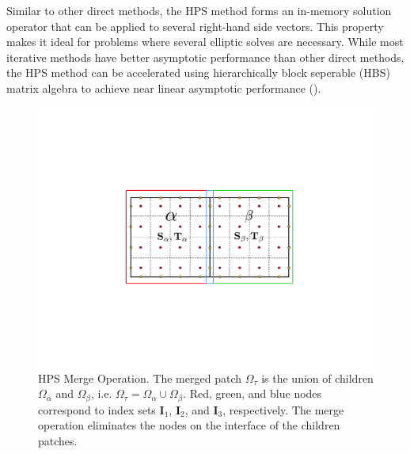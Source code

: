 Similar to other direct methods, the HPS method forms an in-memory solution operator that can be applied to several right-hand side vectors. This property makes it ideal for problems where several elliptic solves are necessary. While most iterative methods have better asymptotic performance than other direct methods, the HPS method can be accelerated using hierarchically block seperable (HBS) matrix algebra to achieve near linear asymptotic performance (\cite{gillman2014direct}).

\begin{figure}
    \centering
    \includegraphics[width=0.7\columnwidth]{figures/merge_figure.pdf}
    \caption{HPS Merge Operation. The merged patch $\Omega_{\tau}$ is the union of children $\Omega_{\alpha}$ and $\Omega_{\beta}$, i.e. $\Omega_{\tau} = \Omega_{\alpha} \cup \Omega_{\beta}$. Red, green, and blue nodes correspond to index sets $\textbf{I}_1$, $\textbf{I}_2$, and $\textbf{I}_3$, respectively. The merge operation eliminates the nodes on the interface of the children patches.}
    \label{fig:merge}
\end{figure}

